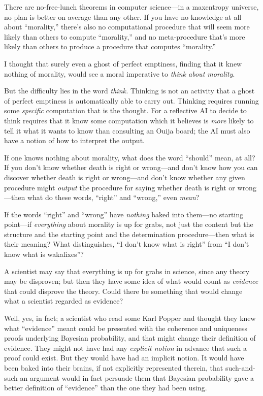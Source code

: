 {
 There are no-free-lunch theorems in computer science---in a
maxentropy universe, no plan is better on average than any other. If
you have no knowledge at all about
``morality,''
there's also no computational procedure that will seem
more likely than others to compute
``morality,'' and no meta-procedure
that's more likely than others to produce a procedure
that computes ``morality.''}

{
 I thought that surely even a ghost of perfect emptiness, finding
that it knew nothing of morality, would see a moral imperative to
\textit{think about morality}.}

{
 But the difficulty lies in the word \textit{think.} Thinking is
not an activity that a ghost of perfect emptiness is automatically able
to carry out. Thinking requires running some \textit{specific}
computation that is the thought. For a reflective AI to decide to think
requires that it know some computation which it believes is
\textit{more} likely to tell it what it wants to know than consulting
an Ouija board; the AI must also have a notion of how to interpret the
output.}

{
 If one knows nothing about morality, what does the word
``should'' mean, at all? If you
don't know whether death is right or wrong---and
don't know how you can discover whether death is right
or wrong---and don't know whether any given procedure
might \textit{output} the procedure for saying whether death is right
or wrong---then what do these words,
``right'' and
``wrong,'' even \textit{mean}?}

{
 If the words ``right'' and
``wrong'' have \textit{nothing}
baked into them---no starting point---if \textit{everything} about
morality is up for grabs, not just the content but the structure and
the starting point and the determination procedure---then what is their
meaning? What distinguishes, ``I don't
know what is right'' from ``I
don't know what is wakalixes''?}

{
 A scientist may say that everything is up for grabs in science,
since any theory may be disproven; but then they have some idea of what
would count as \textit{evidence} that could disprove the theory. Could
there be something that would change what a scientist regarded as
evidence?}

{
 Well, yes, in fact; a scientist who read some Karl Popper and
thought they knew what ``evidence''
meant could be presented with the coherence and uniqueness proofs
underlying Bayesian probability, and that might change their definition
of evidence. They might not have had any \textit{explicit notion} in
advance that such a proof could exist. But they would have had an
implicit notion. It would have been baked into their brains, if not
explicitly represented therein, that such-and-such an argument would in
fact persuade them that Bayesian probability gave a better definition
of ``evidence'' than the one they
had been using.}

